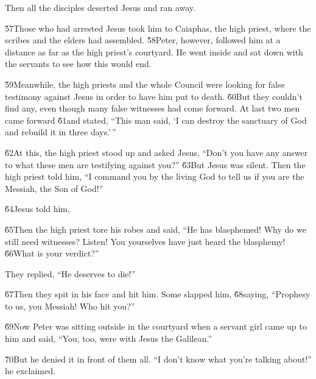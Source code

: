 Then all the disciples deserted Jesus and ran away.

\v{57}Those who had arrested Jesus took him to Caiaphas, the high priest, where the scribes and the elders had assembled. \v{58}Peter, however, followed him at a distance as far as the high priest's courtyard. He went inside and sat down with the servants to see how this would end.

\v{59}Meanwhile, the high priests and the whole Council were looking for false testimony against Jesus in order to have him put to death. \v{60}But they couldn't find any, even though many false witnesses had come forward. At last two men came forward \v{61}and stated, ``This man said, `I can destroy the sanctuary of God and rebuild it in three days.'\,''

\v{62}At this, the high priest stood up and asked Jesus, ``Don't you have any answer to what these men are testifying against you?'' \v{63}But Jesus was silent. Then the high priest told him, ``I command you by the living God to tell us if you are the Messiah, the Son of God!''

\v{64}Jesus told him, 

\v{65}Then the high priest tore his robes and said, ``He has blasphemed! Why do we still need witnesses? Listen! You yourselves have just heard the blasphemy! \v{66}What is your verdict?''

They replied, ``He deserves to die!''

\v{67}Then they spit in his face and hit him. Some slapped him, \v{68}saying, ``Prophesy to us, you Messiah! Who hit you?''

\v{69}Now Peter was sitting outside in the courtyard when a servant girl came up to him and said, ``You, too, were with Jesus the Galilean.''

\v{70}But he denied it in front of them all. ``I don't know what you're talking about!'' he exclaimed.

